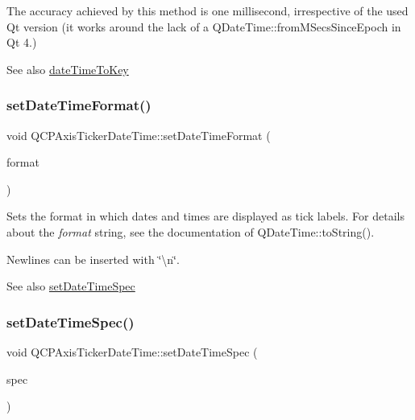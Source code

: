 The accuracy achieved by this method is one millisecond, irrespective of the used Qt version (it works around the lack of a Q\+Date\+Time\+::from\+M\+Secs\+Since\+Epoch in Qt 4.)

\begin{DoxySeeAlso}{See also}
\hyperlink{classQCPAxisTickerDateTime_aa24f293f16fff0f937bf71f4140033f1}{date\+Time\+To\+Key} 
\end{DoxySeeAlso}
\mbox{\label{classQCPAxisTickerDateTime_ad52660a82f688395468674d555f6a86b}} 
\subsubsection{\texorpdfstring{set\+Date\+Time\+Format()}{setDateTimeFormat()}}
{\footnotesize\ttfamily void Q\+C\+P\+Axis\+Ticker\+Date\+Time\+::set\+Date\+Time\+Format (\begin{DoxyParamCaption}\item[{const Q\+String \&}]{format }\end{DoxyParamCaption})}

Sets the format in which dates and times are displayed as tick labels. For details about the {\itshape format} string, see the documentation of Q\+Date\+Time\+::to\+String().

Newlines can be inserted with \char`\"{}\textbackslash{}n\char`\"{}.

\begin{DoxySeeAlso}{See also}
\hyperlink{classQCPAxisTickerDateTime_afbd987c7197e42ab61e67fb1c38abebc}{set\+Date\+Time\+Spec} 
\end{DoxySeeAlso}
\mbox{\label{classQCPAxisTickerDateTime_afbd987c7197e42ab61e67fb1c38abebc}} 
\subsubsection{\texorpdfstring{set\+Date\+Time\+Spec()}{setDateTimeSpec()}}
{\footnotesize\ttfamily void Q\+C\+P\+Axis\+Ticker\+Date\+Time\+::set\+Date\+Time\+Spec (\begin{DoxyParamCaption}\item[{Qt\+::\+Time\+Spec}]{spec }\end{DoxyParamCaption})}

